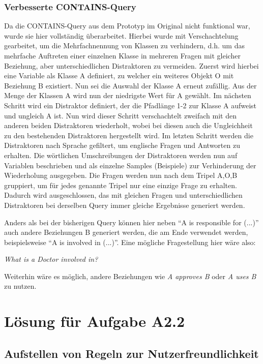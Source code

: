 \documentclass[headsepline,titlepage,ngerman,twoside,12pt]{report}
\begin{document}
\subsubsection{Verbesserte CONTAINS-Query}
Da die CONTAINS-Query aus dem Prototyp im Original nicht funktional war, wurde sie hier vollständig überarbeitet.
Hierbei wurde mit Verschachtelung gearbeitet, um die Mehrfachnennung von Klassen zu verhindern, d.h. um das mehrfache Auftreten einer einzelnen Klasse in mehreren Fragen mit gleicher Beziehung, aber unterschiedlichen Distraktoren zu vermeiden.
Zuerst wird hierbei eine Variable als Klasse A definiert, zu welcher ein weiteres Objekt O mit Beziehung B existiert. Nun sei die Auswahl der Klasse A erneut zufällig.
Aus der Menge der Klassen A wird nun der niedrigste Wert für A gewählt.
Im nächsten Schritt wird ein Distraktor definiert, der die Pfadlänge 1-2 zur Klasse A aufweist und ungleich A ist.
Nun wird dieser Schritt verschachtelt zweifach mit den anderen beiden Distraktoren wiederholt, wobei bei diesen auch die Ungleichheit zu den bestehenden Distraktoren hergestellt wird.
Im letzten Schritt werden die Distraktoren nach Sprache gefiltert, um englische Fragen und Antworten zu erhalten.
Die wörtlichen Umschreibungen der Distraktoren werden nun auf Variablen beschrieben und als einzelne Samples (Beispiele) zur Verhinderung der Wiederholung ausgegeben.
Die Fragen werden nun nach dem Tripel A,O,B gruppiert, um für jedes genannte Tripel nur eine einzige Frage zu erhalten.
Dadurch wird ausgeschlossen, das mit gleichen Fragen und unterschiedlichen Distraktoren bei derselben Query immer gleiche Ergebnisse generiert werden.

Anders als bei der bisherigen Query können hier neben \enquote{A is responsible for (...)} auch andere Beziehungen B generiert werden, die am Ende verwendet werden, beispielsweise \enquote{A is involved in (...)}.
Eine mögliche Fragestellung hier wäre also:

\textit{What is a Doctor involved in?}

Weiterhin wäre es möglich, andere Beziehungen wie \textit{A approves B} oder \textit{A uses B} zu nutzen.

\section{Lösung für Aufgabe A2.2}

\subsection{Aufstellen von Regeln zur Nutzerfreundlichkeit}
\end{document}
